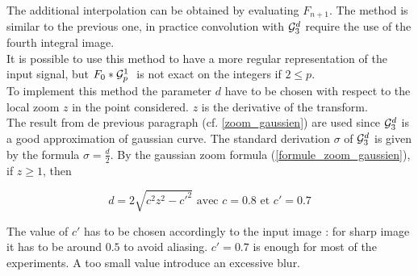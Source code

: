 The additional interpolation can be obtained by evaluating $F_{n+1}$. The method is similar to the previous one, in practice convolution with $\mathcal{G}_3^d$ require the use of the fourth integral image.\\
It is possible to use this method to have a more regular representation of the input signal, but $F_0 * \mathcal{G}_p^1~$ is not exact on the integers if $2\le p$.\\

To implement this method the parameter $d$ have to be chosen with respect to the local zoom $z$ in the point considered. $z$ is the derivative of the transform.\\
The result from de previous paragraph (cf. \ref{zoom_gaussien}) are used since $\mathcal{G}_3^d$ is a good approximation of gaussian curve. The standard derivation $\sigma$ of $\mathcal{G}_3^d$ is given by the formula $\sigma=\frac{d}{2}$. By the gaussian zoom formula (\ref{formule_zoom_gaussien}), if $z\ge 1$, then

\begin{equation*}
d=2\sqrt{c^2 z^2 - c'^2} \text{ avec } c=0.8 \text{ et } c'=0.7
\end{equation*}

The value of $c'$ has to be chosen accordingly to the input image : for sharp image it has to be around $0.5$ to avoid aliasing. $c'=0.7$ is enough for most of the experiments. A too small value introduce an excessive blur.



